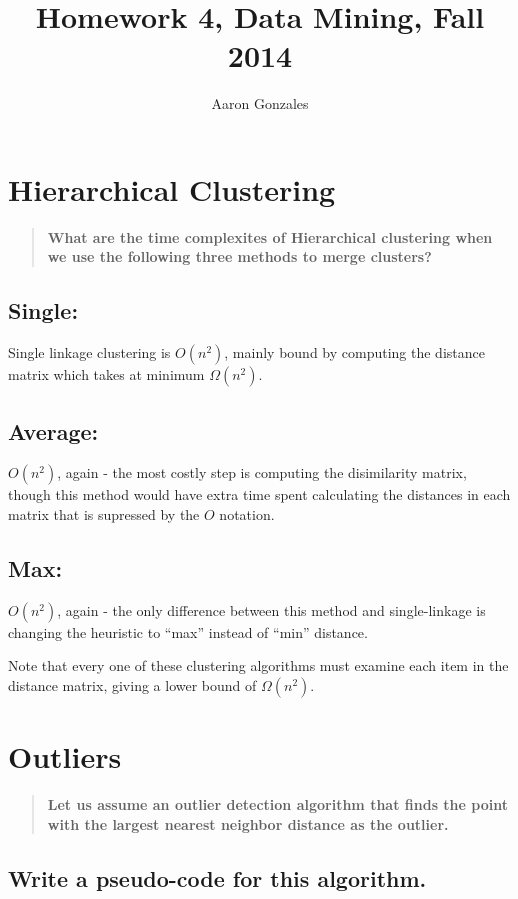 \documentclass{article}
\begin{document}
\title{Homework 4, Data Mining, Fall 2014}
\author{Aaron Gonzales}
\maketitle


\section{Hierarchical Clustering}
\begin{quote}
  \textbf{What are the time complexites of Hierarchical clustering when we use
  the following three methods to merge clusters?} 
\end{quote}

\subsection{Single:}
Single linkage clustering is $O(n^2)$, mainly bound by computing the distance
matrix which takes at minimum $\Omega(n^2)$.

\subsection{Average:}
$O(n^2)$, again - the most costly step is computing the disimilarity matrix,
though this method would have extra time spent calculating the distances in
each matrix that is supressed by the $O$ notation.

\subsection{Max:}
$O(n^2)$, again - the only difference between this method and single-linkage is
changing the heuristic to ``max'' instead of ``min'' distance. 
  
Note that every one of these clustering algorithms must examine each item in
the distance matrix, giving a lower bound of $\Omega(n^2)$.
  

\section{Outliers}
\begin{quote}
 \textbf{ Let us assume an outlier detection algorithm that finds the point with the
  largest nearest neighbor distance as the outlier.}
\end{quote}
\subsection{Write a pseudo-code for this algorithm.}
 
\end{document}
